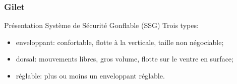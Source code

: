 \subsubsection{Gilet}

\begin{frame}{Présentation}
{Système de Sécurité Gonflable (SSG)}
Trois types:
\begin{itemize}[<+->]
\item enveloppant: \textcolor{green!60!black}{confortable, flotte à la
  verticale}, \textcolor{red!50!black}{taille non négociable};
\item dorsal: \textcolor{green!60!black}{mouvements libres, gros volume},
  \textcolor{red!50!black}{flotte sur le ventre en surface};
\item réglable: plus ou moins un enveloppant réglable.
\end{itemize}
\end{frame}

